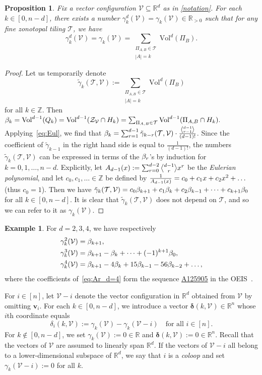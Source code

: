 \documentclass[11pt]{amsart}
\theoremstyle{plain}
\newtheorem{proposition}[theorem]{Proposition}
\theoremstyle{definition}
\newtheorem{example}[theorem]{Example}
\def\Z{\mathbb{Z}}
\def\R{\mathbb{R}}
\def\v{{\bm{v}}}
\def\V{\mathcal{V}}
\def\ddelta{\bm{\delta}}
\def\Zon{\mathcal{Z}}
\def\ZV{\Zon_\V}
\def\Vol{\mathrm{Vol}}
\def\VC{\V}
\def\Tcal{\mathcal{T}}
\def\Tiling{\Tcal}
\def\tile{\Pi}
\newcommand\summa[2]{\sum_{\substack{#1 \\ #2}}}
\def\sumlevel#1{\summa{\tile_{A,B}\in\Tiling}{|A|=#1}}
\def\Voldd{\Vol^{d-1}}
\def\VolX(#1){\Vol^d(\tile_{#1})}
\def\VolB{\VolX(B)}
\let\subset\subseteq
\newcommand{\Euli}{\genfrac{\langle}{\rangle}{0pt}{}}
\def\Eul(#1,#2){\Euli{#1}{#2}}
\begin{document}
\begin{proposition}
Fix a vector configuration $\V \subset \R^d$ as in \cref{notation}.
	For each $k\in[0,n-d]$, there exists a number $\gamma_k^d(\VC) = \gamma_k(\VC)\in\R_{>0}$ such that for any fine zonotopal tiling $\Tiling$, we have
\begin{equation}\label{eq:gamma_k}
	\gamma_k^d(\VC) = \gamma_k(\VC)=\sumlevel{k} \VolB.
\end{equation}
\end{proposition}
\begin{proof}
Let us temporarily denote  
\[\tilde{\gamma}_k(\Tiling, \VC) := \sumlevel{k} \VolB\]
for all $k\in\Z$. Then $\Ar_k=\Voldd(Q_k) = \Vol^{d-1}(\ZV \cap H_k) = 
	\sum_{\tile_{A,B}\in \Tiling}\Vol^{d-1}( \tile_{A,B} \cap H_k).$
	Applying~\eqref{eq:Eul}, we find that $\Ar_k=\sum_{r=1}^{d-1} \tilde{\gamma}_{k-r}(\Tiling, \VC)\cdot \frac{\Eul(d-1,r-1)}{(d-1)!}$. Since the coefficient of $\tilde{\gamma}_{k-1}$ in the right hand side is equal to $\frac1{(d-1)!}$, the numbers $\tilde{\gamma}_k(\Tiling, \VC)$ can be expressed in terms of the $\beta_r$'s by induction for $k=0,1,\dots, n-d$. Explicitly, let $\Eupoly_{d-1}(x):=\sum_{r=0}^{d-2} \Eul(d-1,r)x^r$ be the \emph{Eulerian polynomial}, and let $c_0,c_1,\dots\in\Z$ be defined by $\frac1{A_{d-1}(x)}=c_0+c_1x+c_2x^2+\dots$ (thus $c_0=1$). Then we have $\tilde{\gamma}_k(\Tiling, \VC)=c_0\Ar_{k+1}+c_1\Ar_k+c_2\Ar_{k-1}+\dots+c_{k+1}\Ar_0$ for all $k\in[0,n-d]$. It is clear that $\tilde{\gamma}_k(\Tiling, \VC)$ does not depend on $\Tiling$, and so we can refer to it as 
	$\gamma_k(\VC)$.
\end{proof}
\begin{example}
For $d=2,3,4$, we have respectively
	\begin{align}
\label{eq:gamma_d=2}
\gamma_k^2(\VC)&=\Ar_{k+1}, \\ 
  \gamma_k^3(\VC)&=\Ar_{k+1}-\Ar_{k}+\dots+(-1)^{k+1}\Ar_0, \\
\label{eq:Ar_d=4}
\gamma_k^4(\VC)&=\Ar_{k+1}-4\Ar_{k}+15\Ar_{k-1}-56\Ar_{k-2}+\dots, 
\end{align}
where the coefficients of~\eqref{eq:Ar_d=4} form the sequence \href{http://oeis.org/A125905}{A125905} in the OEIS~\cite{OEIS}.
\end{example}

For $i\in[n]$, let $\VC-i$ denote the vector configuration in $\R^d$ obtained from $\VC$ by omitting $\v_i$. For each $k\in[0,n-d]$, we introduce a vector $\ddelta(k,\VC)\in\R^n$ whose $i$th coordinate equals 
\begin{equation}\label{eq:delta}
  \delta_i(k,\VC):=\gamma_k(\VC)-\gamma_k(\VC-i) \quad\text{for all $i\in[n]$}.
\end{equation}
\noindent For $k\notin [0,n-d]$, we set $\gamma_k(\VC):=0\in\R$ and $\ddelta(k,\VC):=0\in\R^n$. Recall that the vectors of $\VC$ are assumed to linearly span $\R^d$. If the vectors of $\VC-i$ all belong to a lower-dimensional subspace of $\R^d$, we say that $i$ is a \emph{coloop} and set $\gamma_k(\VC-i):=0$ for all $k$.
\end{document}
